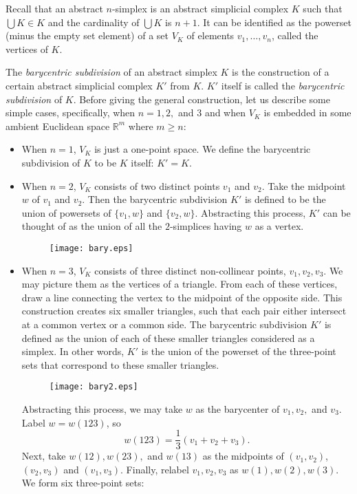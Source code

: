 \documentclass[12pt]{article}
\begin{document}
Recall that an abstract $n$-simplex is an abstract simplicial complex $K$ such that $\bigcup K\in K$ and the cardinality of $\bigcup K$ is $n+1$.  It can be identified as the powerset (minus the empty set element) of a set $V_K$ of elements $v_1,\ldots, v_n$, called the vertices of $K$.

The \emph{barycentric subdivision} of an abstract simplex $K$ is the construction of a certain abstract simplicial complex $K'$ from $K$.  $K'$ itself is called the \emph{barycentric subdivision} of $K$.  Before giving the general construction, let us describe some simple cases, specifically, when $n=1,2,$ and $3$ and when $V_K$ is embedded in some ambient Euclidean space $\mathbb{R}^m$ where $m\ge n$:
\begin{itemize}
\item When $n=1$, $V_K$ is just a one-point space.  We define the barycentric subdivision of $K$ to be $K$ itself: $K'=K$.
\item When $n=2$, $V_K$ consists of two distinct points $v_1$ and $v_2$.  Take the midpoint $w$ of $v_1$ and $v_2$.  Then the barycentric subdivision $K'$ is defined to be the union of powersets of $\lbrace v_1, w\rbrace$ and $\lbrace v_2, w\rbrace$.  Abstracting this process, $K'$ can be thought of as the union of all the $2$-simplices having $w$ as a vertex.
\begin{figure}[!htb]
\begin{center}
\texttt{[image: bary.eps]}
\end{center}
\end{figure}
\item When $n=3$, $V_K$ consists of three distinct non-collinear points, $v_1,v_2,v_3$.  We may picture them as the vertices of a triangle.  From each of these vertices, draw a line connecting the vertex to the midpoint of the opposite side.  This construction creates six smaller triangles, such that each pair either intersect at a common vertex or a common side.  The barycentric subdivision $K'$ is defined as the union of each of these smaller triangles considered as a simplex.  In other words, $K'$ is the union of the powerset of the three-point sets that correspond to these smaller triangles.  
\begin{figure}[!htb]
\begin{center}
\texttt{[image: bary2.eps]}
\end{center}
\end{figure}
Abstracting this process, we may take $w$ as the barycenter of $v_1,v_2,$ and $v_3$.  Label $w=w(123)$, so $$w(123)=\frac{1}{3}(v_1+v_2+v_3).$$  Next, take $w(12),w(23),$ and $w(13)$ as the midpoints of $(v_1,v_2)$, $(v_2,v_3)$ and $(v_1,v_3)$.  Finally, relabel $v_1,v_2,v_3$ as $w(1),w(2),w(3)$.  We form six three-point sets:

\end{itemize}
\end{document}
